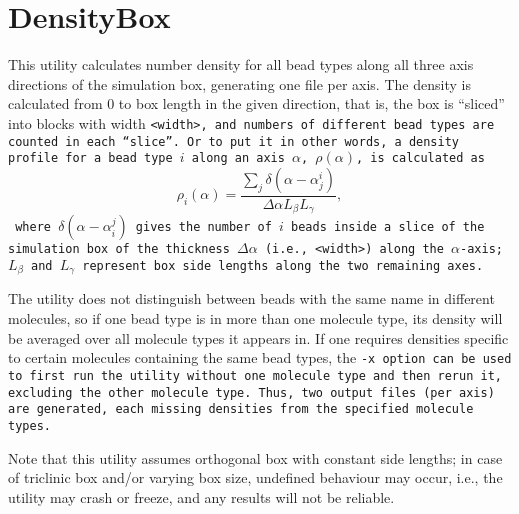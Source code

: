 \section{DensityBox} \label{sec:DensityBox}

This utility calculates number density for all bead types along all three axis
directions of the simulation box, generating one file per axis. The density is
calculated from 0 to box length in the given direction, that is, the box is
\enquote{sliced} into blocks with width \tt{<width>}, and numbers of different
bead types are counted in each \enquote{slice}. Or to put it in other words, a
density profile for a bead type $i$ along an axis $\alpha$, $\rho(\alpha)$, is
calculated as
\begin{equation}
  \rho_i(\alpha) = \frac{\sum_j\delta(\alpha-\alpha_j^i)}
                   {\Delta\alpha L_\beta L_\gamma},
\end{equation}
where $\delta(\alpha-\alpha_i^j)$ gives the number of $i$ beads inside a slice
of the simulation box of the thickness $\Delta\alpha$ (i.e., \tt{<width>}) along
the $\alpha$-axis; $L_\beta$ and $L_\gamma$ represent box side lengths along the
two remaining axes.

The utility does not distinguish between beads with the same name in different
molecules, so if one bead type is in more than one molecule type, its density
will be averaged over all molecule types it appears in. If one requires
densities specific to certain molecules containing the same bead types, the
\tt{-x} option can be used to first run the utility without one molecule type
and then rerun it, excluding the other molecule type. Thus, two output files
(per axis) are generated, each missing densities from the specified molecule
types.

Note that this utility assumes orthogonal box with constant side lengths; in
case of triclinic box and/or varying box size, undefined behaviour may occur,
i.e., the utility may crash or freeze, and any results will not be reliable.

